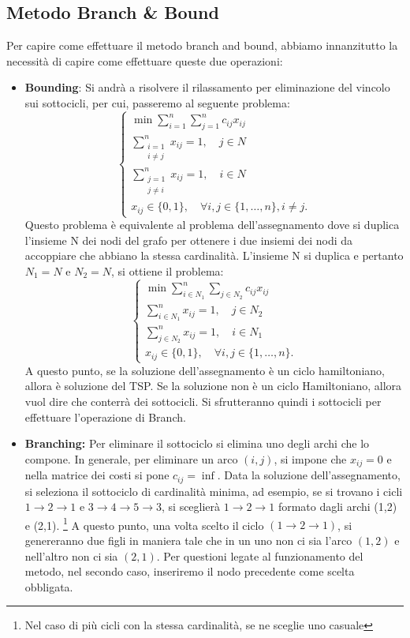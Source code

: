 \subsection{Metodo Branch \& Bound}
Per capire come effettuare il metodo branch and bound, abbiamo innanzitutto la necessità di capire come effettuare queste due operazioni:
\begin{itemize}
    \item \textbf{Bounding}: Si andrà a risolvere il rilassamento per eliminazione del vincolo sui sottocicli, per cui, passeremo al seguente problema:
    \[
        \begin{cases}
        \min \sum_{i=1}^n \sum_{j=1}^n c_{ij}x_{ij} \\
        \sum_{\substack{i=1 \\ i \neq j}}^n x_{ij} = 1, \quad j \in N \\
        \sum_{\substack{j=1 \\ j \neq i}}^n x_{ij} = 1, \quad i \in N \\
        x_{ij} \in \{0, 1\}, \quad \forall i, j \in \{1, \dots, n\}, i \neq j.
        \end{cases}
    \]
    Questo problema è equivalente al problema dell'assegnamento dove si duplica l'insieme N dei nodi del grafo per ottenere i due insiemi dei nodi da accoppiare che abbiano la stessa cardinalità. L'insieme N si duplica e pertanto $N_1 = N$ e $N_2 = N$, si ottiene il problema:
    \[
        \begin{cases}
            \min \sum_{i \in N_1}^n \sum_{j \in N_2} c_{ij}x_{ij} \\
            \sum_{i \in N_1}^n x_{ij} = 1, \quad j \in N_2 \\
            \sum_{j \in N_2}^n x_{ij} = 1, \quad i \in N_1 \\
            x_{ij} \in \{0, 1\}, \quad \forall i, j \in \{1, \dots, n\}.
        \end{cases}
    \]
    A questo punto, se la soluzione dell'assegnamento è un ciclo hamiltoniano, allora è soluzione del TSP. Se la soluzione non è un ciclo Hamiltoniano, allora vuol dire che conterrà dei sottocicli. Si sfrutteranno quindi i sottocicli per effettuare l'operazione di Branch.
    \item \textbf{Branching:} Per eliminare il sottociclo si elimina uno degli archi che lo compone. In generale, per eliminare un arco $(i, j)$, si impone che $x_{ij} = 0$ e nella matrice dei costi si pone $c_{ij} = \inf$. Data la soluzione dell'assegnamento, si seleziona il sottociclo di cardinalità minima, ad esempio, se si trovano i cicli $ 1\rightarrow 2 \rightarrow 1$ e $3\rightarrow 4\rightarrow 5 \rightarrow 3$, si sceglierà $1\rightarrow 2 \rightarrow 1$ formato dagli archi (1,2) e (2,1). \footnote{Nel caso di più cicli con la stessa cardinalità, se ne sceglie uno casuale} A questo punto, una volta scelto il ciclo $(1 \rightarrow 2 \rightarrow 1)$, si genereranno due figli in maniera tale che in un uno non ci sia l'arco $(1,2)$ e nell'altro non ci sia $(2,1)$. Per questioni legate al funzionamento del metodo, nel secondo caso, inseriremo il nodo precedente come scelta obbligata.  

\end{itemize}
